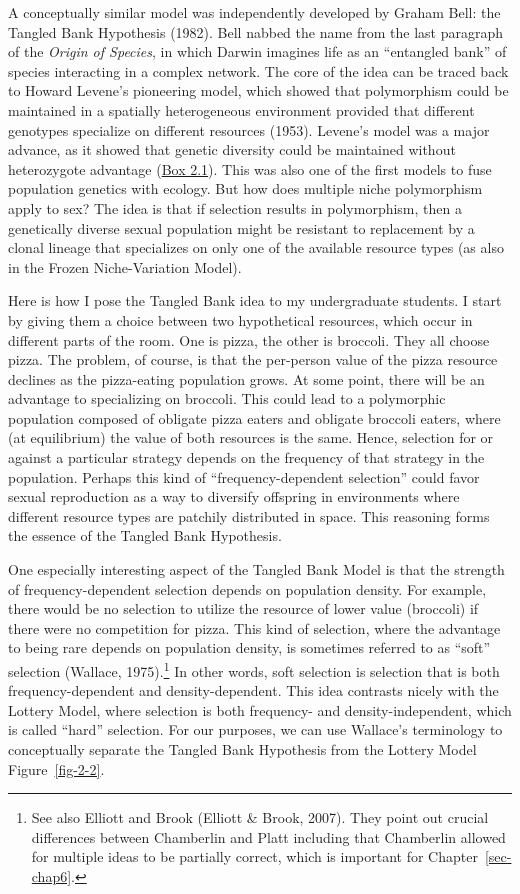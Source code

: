 \documentclass[
  letterpaper,
]{book}
\begin{document}
A conceptually similar model was independently developed by Graham Bell:
the Tangled Bank Hypothesis (1982). Bell nabbed the name from the last
paragraph of the \emph{Origin of Species}, in which Darwin imagines life
as an ``entangled bank'' of species interacting in a complex network.
The core of the idea can be traced back to Howard Levene's pioneering
model, which showed that polymorphism could be maintained in a spatially
heterogeneous environment provided that different genotypes specialize
on different resources (1953). Levene's model was a major advance, as it
showed that genetic diversity could be maintained without heterozygote
advantage (\protect\hyperlink{callout-2.1}{Box 2.1}). This was also one
of the first models to fuse population genetics with ecology. But how
does multiple niche polymorphism apply to sex? The idea is that if
selection results in polymorphism, then a genetically diverse sexual
population might be resistant to replacement by a clonal lineage that
specializes on only one of the available resource types (as also in the
Frozen Niche-Variation Model).

Here is how I pose the Tangled Bank idea to my undergraduate students. I
start by giving them a choice between two hypothetical resources, which
occur in different parts of the room. One is pizza, the other is
broccoli. They all choose pizza. The problem, of course, is that the
per-person value of the pizza resource declines as the pizza-eating
population grows. At some point, there will be an advantage to
specializing on broccoli. This could lead to a polymorphic population
composed of obligate pizza eaters and obligate broccoli eaters, where
(at equilibrium) the value of both resources is the same. Hence,
selection for or against a particular strategy depends on the frequency
of that strategy in the population. Perhaps this kind of
``frequency-dependent selection'' could favor sexual reproduction as a
way to diversify offspring in environments where different resource
types are patchily distributed in space. This reasoning forms the
essence of the Tangled Bank Hypothesis.

One especially interesting aspect of the Tangled Bank Model is that the
strength of frequency-dependent selection depends on population density.
For example, there would be no selection to utilize the resource of
lower value (broccoli) if there were no competition for pizza. This kind
of selection, where the advantage to being rare depends on population
density, is sometimes referred to as ``soft'' selection (Wallace,
1975).\footnote{See also Elliott and Brook (Elliott \& Brook, 2007).
  They point out crucial differences between Chamberlin and Platt
  including that Chamberlin allowed for multiple ideas to be partially
  correct, which is important for Chapter~\ref{sec-chap6}.} In other
words, soft selection is selection that is both frequency-dependent and
density-dependent. This idea contrasts nicely with the Lottery Model,
where selection is both frequency- and density-independent, which is
called ``hard'' selection. For our purposes, we can use Wallace's
terminology to conceptually separate the Tangled Bank Hypothesis from
the Lottery Model Figure~\ref{fig-2-2}.
\end{document}
